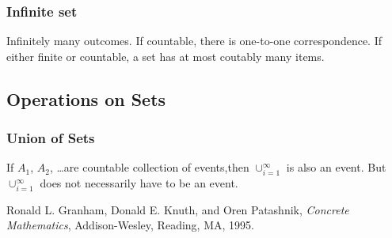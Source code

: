 \documentclass{book}
\begin{document}
			\subsubsection{Infinite set}
			Infinitely many outcomes.  If countable, there 
			is one-to-one correspondence.  If either finite or countable, 
			a set has at most coutably many items.  

		\subsection{Operations on Sets}
			\subsubsection{Union of Sets}
			If $A_1$, $A_2$, \ldots  are countable collection of events,then 
			$\cup_{i=1}^{\infty}$ is also an event.  But $\cup_{i=1}^{\infty}$ 
			does not necessarily have to be an event.  






\begin{thebibliography}{9}
		Ronald L.   Granham, Donald E.  Knuth, and Oren Patashnik,
		\textit{Concrete Mathematics},
		Addison-Wesley, Reading, MA, 1995.
	\end{thebibliography}
\end{document}
